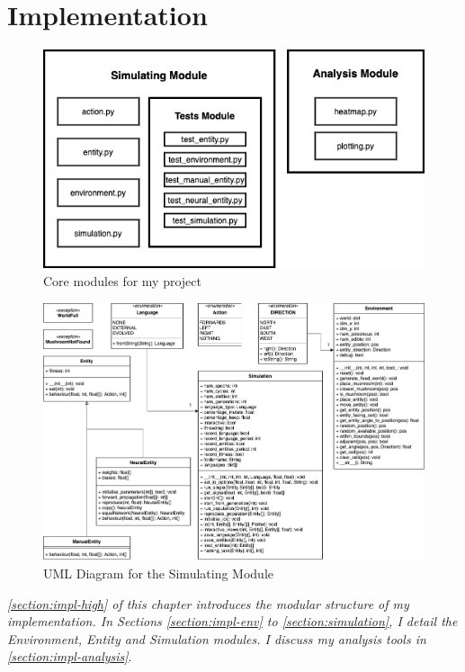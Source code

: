 \documentclass[12pt,a4paper]{report}
\begin{document}
\chapter{Implementation}


\begin{figure}[t]
  \centering
  \includegraphics[width=.8\linewidth]{figs/modules}
  \caption{Core modules for my project}
  \label{fig:modules}
\end{figure}

\begin{figure}[p]
  \centering
  \includegraphics[angle=90, width=.9\linewidth]{figs/uml}
  \caption{UML Diagram for the Simulating Module}
  \label{fig:uml}
\end{figure}


\emph{\cref{section:impl-high} of this chapter introduces the modular structure of my implementation. In Sections \ref{section:impl-env} to \ref{section:simulation}, I detail the Environment, Entity and Simulation modules. I discuss my analysis tools in \cref{section:impl-analysis}}.
\end{document}
